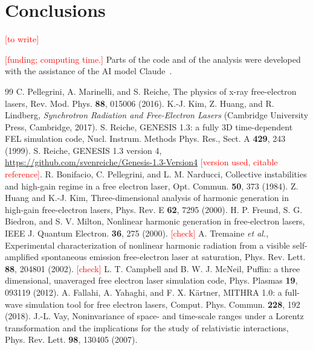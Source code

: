 \documentclass[aps,prab,reprint,floatfix,superscriptaddress,amsmath,amssymb]{revtex4-2}
\newcommand{\todo}[1]{\textcolor{red}{[#1]}}
\begin{document}
\section{Conclusions}\label{sec:concl}

\todo{to write}

\begin{acknowledgments}
\todo{funding; computing time.} Parts of the code and of the analysis were developed with the assistance of the AI model Claude~\cite{Claude}.
\end{acknowledgments}

\begin{thebibliography}{99}
 C. Pellegrini, A. Marinelli, and S. Reiche, The physics of x-ray free-electron lasers, Rev. Mod. Phys. \textbf{88}, 015006 (2016).
 K.-J. Kim, Z. Huang, and R. Lindberg, \textit{Synchrotron Radiation and Free-Electron Lasers} (Cambridge University Press, Cambridge, 2017).
 S. Reiche, GENESIS 1.3: a fully 3D time-dependent FEL simulation code, Nucl. Instrum. Methods Phys. Res., Sect. A \textbf{429}, 243 (1999).
 S. Reiche, GENESIS 1.3 version 4, \url{https://github.com/svenreiche/Genesis-1.3-Version4} \todo{version used, citable reference}.
 R. Bonifacio, C. Pellegrini, and L. M. Narducci, Collective instabilities and high-gain regime in a free electron laser, Opt. Commun. \textbf{50}, 373 (1984).
 Z. Huang and K.-J. Kim, Three-dimensional analysis of harmonic generation in high-gain free-electron lasers, Phys. Rev. E \textbf{62}, 7295 (2000).
 H. P. Freund, S. G. Biedron, and S. V. Milton, Nonlinear harmonic generation in free-electron lasers, IEEE J. Quantum Electron. \textbf{36}, 275 (2000). \todo{check}
 A. Tremaine \textit{et al.}, Experimental characterization of nonlinear harmonic radiation from a visible self-amplified spontaneous emission free-electron laser at saturation, Phys. Rev. Lett. \textbf{88}, 204801 (2002). \todo{check}
 L. T. Campbell and B. W. J. McNeil, Puffin: a three dimensional, unaveraged free electron laser simulation code, Phys. Plasmas \textbf{19}, 093119 (2012).
 A. Fallahi, A. Yahaghi, and F. X. K\"artner, MITHRA 1.0: a full-wave simulation tool for free electron lasers, Comput. Phys. Commun. \textbf{228}, 192 (2018).
 J.-L. Vay, Noninvariance of space- and time-scale ranges under a Lorentz transformation and the implications for the study of relativistic interactions, Phys. Rev. Lett. \textbf{98}, 130405 (2007).

\end{thebibliography}
\end{document}
